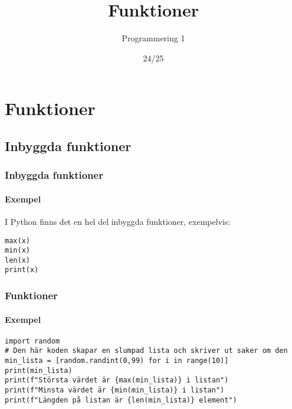 \documentclass[aspectratio=169]{beamer}
\begin{document}


\title{Funktioner}
\date{24/25}
\author{Programmering 1}

\maketitle

\section{Funktioner}

\subsection{Inbyggda funktioner}

\begin{frame}[fragile]
	\frametitle{Inbyggda funktioner}
	\framesubtitle{Exempel}

	I Python finns det en hel del inbyggda funktioner, exempelvis:
	
	\begin{lstlisting}
max(x)
min(x)
len(x)
print(x)
	\end{lstlisting}

\end{frame}

\begin{frame}[fragile]
	\frametitle{Funktioner}
	\framesubtitle{Exempel}

	\begin{lstlisting}
import random
# Den här koden skapar en slumpad lista och skriver ut saker om den
min_lista = [random.randint(0,99) for i in range(10)]
print(min_lista)
print(f"Största värdet är {max(min_lista)} i listan")
print(f"Minsta värdet är {min(min_lista)} i listan")
print(f"Längden på listan är {len(min_lista)} element")
	\end{lstlisting}

\end{frame}
\end{document}
